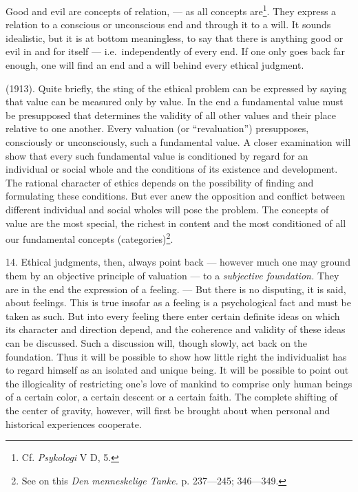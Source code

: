 \documentclass[12pt,a4paper,openany]{book}
\newcommand{\opage}[1]{\marginnote{\footnotesize\textit{[#1]}}}
\begin{document}
\opage{51}Good and evil are concepts of relation, --- as all concepts are\footnote[1]{Cf. \textit{Psykologi}
V D, 5.}. They express a relation to a conscious or
unconscious end and through it to a will. It sounds idealistic, but it is at bottom meaningless, to
say that there is anything good or evil in and for itself --- i.e.\ independently of every end. If
one only goes back far enough, one will find an end and a will behind every ethical judgment.

(1913). Quite briefly, the sting of the ethical problem can be expressed by saying that value can be
measured only by value. In the end a fundamental value must be presupposed that determines the
validity of all other values and their place relative to one another. Every valuation (or
``revaluation'') presupposes, consciously or unconsciously, such a fundamental value. A closer
examination will show that every such fundamental value is conditioned by regard for an individual
or social whole and the conditions of its existence and development. The rational character of ethics
depends on the possibility of finding and formulating these conditions. But ever anew the opposition
and conflict between different individual and social wholes will pose the problem. The concepts of
value are the most special, the richest in content and the most conditioned of all our fundamental
concepts (categories)\footnote[2]{See on this \textit{Den menneskelige Tanke.} p. 237---245;
346---349.}.

14. Ethical judgments, then, always point back --- however much one may ground them by an objective
principle of valuation --- to a \textit{subjective foundation.} They are in the end the expression of
a feeling. --- But there is no disputing, it is said, about feelings. This is true insofar as a
feeling is a psychological fact and must be taken as such. But into every feeling there enter certain
definite ideas on which its character and direction depend, and the coherence and validity of these
ideas can be discussed. Such a discussion will, though slowly, act back on the foundation.
Thus it will be possible to show how little right the individualist has
\opage{52}to regard himself as an isolated and unique being. It will be possible to point out the illogicality
of restricting one's love of mankind to comprise only human beings of a certain color, a certain
descent or a certain faith. The complete shifting of the center of gravity, however, will first be
brought about when personal and historical experiences cooperate.
\end{document}
